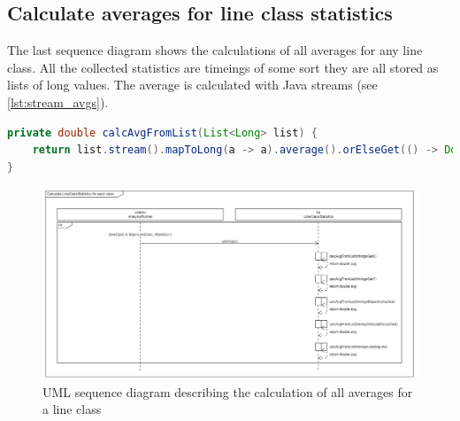 \subsection{Calculate averages for line class statistics}
The last sequence diagram shows the calculations of all averages for any line class. All the collected statistics are timeings of some sort they are all stored as lists of long values. The average is calculated with Java streams (see \ref{lst:stream_avgs}).

\begin{lstlisting}[language=java, caption=Java stream used to calculate average of a list, label=lst:stream_avgs]
private double calcAvgFromList(List<Long> list) {
    return list.stream().mapToLong(a -> a).average().orElseGet(() -> Double.NaN);
}
\end{lstlisting}

\begin{landscape}
    \begin{figure}
        \begin{center}
            \includegraphics[width=1.75\textwidth, height=0.99\textheight]{img/sequence_lcs_avgs.png}
            \caption{UML sequence diagram describing the calculation of all averages for a line class}
            \label{fig:seq_slope_intercept}
        \end{center}
    \end{figure}
\end{landscape}
